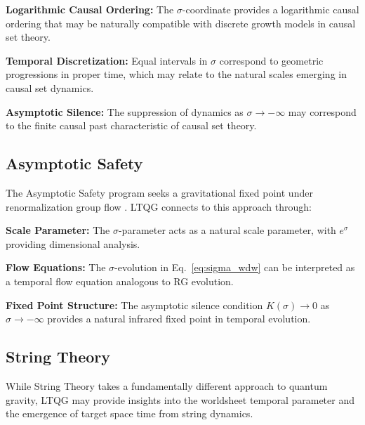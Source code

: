 \documentclass[12pt,a4paper]{article}
\begin{document}
\textbf{Logarithmic Causal Ordering:} The $\sigma$-coordinate provides a logarithmic causal ordering that may be naturally compatible with discrete growth models in causal set theory.

\textbf{Temporal Discretization:} Equal intervals in $\sigma$ correspond to geometric progressions in proper time, which may relate to the natural scales emerging in causal set dynamics.

\textbf{Asymptotic Silence:} The suppression of dynamics as $\sigma \to -\infty$ may correspond to the finite causal past characteristic of causal set theory.

\subsection{Asymptotic Safety}

The Asymptotic Safety program seeks a gravitational fixed point under renormalization group flow \cite{Reuter2012}. LTQG connects to this approach through:

\textbf{Scale Parameter:} The $\sigma$-parameter acts as a natural scale parameter, with $e^{\sigma}$ providing dimensional analysis.

\textbf{Flow Equations:} The $\sigma$-evolution in Eq.~\eqref{eq:sigma_wdw} can be interpreted as a temporal flow equation analogous to RG evolution.

\textbf{Fixed Point Structure:} The asymptotic silence condition $K(\sigma) \to 0$ as $\sigma \to -\infty$ provides a natural infrared fixed point in temporal evolution.

\subsection{String Theory}

While String Theory takes a fundamentally different approach to quantum gravity, LTQG may provide insights into the worldsheet temporal parameter and the emergence of target space time from string dynamics.
\end{document}
